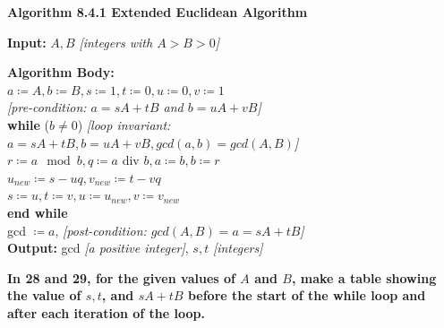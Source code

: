 \documentclass[14pt]{extarticle}
\newcommand{\cy}{\color{cyan}}
\begin{document}
\begin{tcolorbox}[colframe=cyan]
        {\bf \cy Algorithm 8.4.1 Extended Euclidean Algorithm}

        {\bf Input:} $A, B$ {\it [integers with \(A > B > 0\)]}

        \begin{tabbing}
                {\bf Algorithm Body:} \\
                \(a \coloneqq A, b \coloneqq B, s \coloneqq 1, t \coloneqq 0, u \coloneqq 0, v \coloneqq 1\) \\
                {\it [pre-condition: \(a = sA + tB\) and \(b = uA + vB\)]} \\
                {\bf wh}\={\bf ile} (\(b \neq 0\)) {\it [loop invariant: \(a = sA + tB, b = uA + vB, gcd(a,b) = gcd(A,B)\)]} \\
                \> \(r \coloneqq a \mod b, q \coloneqq a \text{ div } b, a \coloneqq b, b \coloneqq r\) \\
                \> \(u_{new} \coloneqq s-uq, v_{new} \coloneqq t-vq\) \\
                \> \(s \coloneqq u, t \coloneqq v, u \coloneqq u_{new}, v \coloneqq v_{new}\) \\
                {\bf end while} \\
                gcd \(\coloneqq a\), {\it [post-condition: \(gcd(A,B) = a = sA + tB\)]} \\
                {\bf Output:} gcd {\it [a positive integer]}, \(s,t\) {\it [integers]}
        \end{tabbing}
\end{tcolorbox}

{\bf \cy In 28 and 29, for the given values of $A$ and $B$, make a table showing the value of \(s, t\), and \(sA + tB\)
before the start of the while loop and after each iteration of the loop.}
\end{document}
